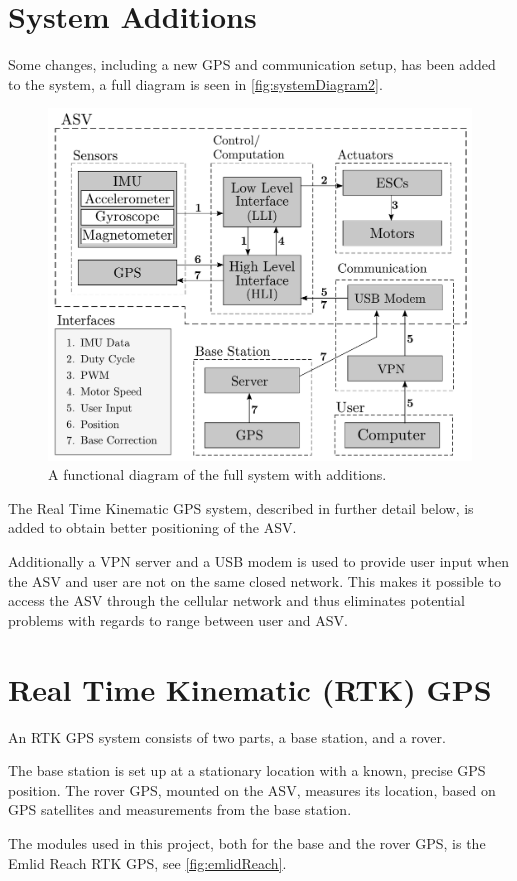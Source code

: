 \section{System Additions}
Some changes, including a new GPS and communication setup, has been added to the system, a full diagram is seen in \autoref{fig:systemDiagram2}.
%
\begin{figure}[H]
  \includegraphics[width=.65\textwidth]{figures/systemDiagram5}
  \caption{A functional diagram of the full system with additions.}
  \label{fig:systemDiagram2}
\end{figure}
%
The Real Time Kinematic GPS system, described in further detail below, is added to obtain better positioning of the ASV. 

Additionally a VPN server and a USB modem is used to provide user input when the ASV and user are not on the same closed network. This makes it possible to access the ASV through the cellular network and thus eliminates potential problems with regards to range between user and ASV.

\section{Real Time Kinematic (RTK) GPS}
An RTK GPS system consists of two parts, a base station, and a rover.

The base station is set up at a stationary location with a known, precise GPS position. The rover GPS, mounted on the ASV, measures its location, based on GPS satellites and measurements from the base station.\cite{EmlidRTK}

The modules used in this project, both for the base and the rover GPS, is the Emlid Reach RTK GPS, see \autoref{fig:emlidReach}.

